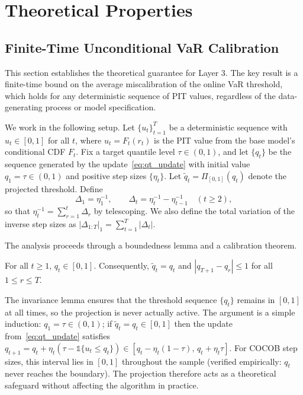 \section{Theoretical Properties}\label{sec:theory}


\subsection{Finite-Time Unconditional VaR Calibration}\label{sec:var_theory}

This section establishes the theoretical guarantee for Layer 3. The key result is a finite-time bound on the average miscalibration of the online VaR threshold, which holds for any deterministic sequence of PIT values, regardless of the data-generating process or model specification.

We work in the following setup. Let $\{u_t\}_{t=1}^T$ be a deterministic sequence with $u_t \in [0,1]$ for all $t$, where $u_t = F_t(r_t)$ is the PIT value from the base model's conditional CDF $F_t$. Fix a target quantile level $\tau \in (0,1)$, and let $\{q_t\}$ be the sequence generated by the update~\eqref{eq:qt_update} with initial value $q_1 = \tau \in (0,1)$ and positive step sizes $\{\eta_t\}$. Let $\tilde{q}_t = \Pi_{[0,1]}(q_t)$ denote the projected threshold. Define
\begin{equation}\label{eq:MT_Delta}
    \Delta_1 = \eta_1^{-1}, \qquad \Delta_t = \eta_t^{-1} - \eta_{t-1}^{-1} \quad (t \geq 2),
\end{equation}
so that $\eta_t^{-1} = \sum_{r=1}^{t} \Delta_r$ by telescoping. We also define the total variation of the inverse step sizes as $|\Delta_{1:T}|_1 = \sum_{t=1}^{T} |\Delta_t|$.

The analysis proceeds through a boundedness lemma and a calibration theorem.

\begin{lemma}[Invariance of $q_t \in {[0,1]}$]\label{lem:bounded}
For all $t \geq 1$, $q_t \in [0,1]$. Consequently, $\tilde{q}_t = q_t$ and $|q_{T+1} - q_r| \leq 1$ for all $1 \leq r \leq T$.
\end{lemma}

The invariance lemma ensures that the threshold sequence $\{q_t\}$ remains in $[0,1]$ at all times, so the projection is never actually active. The argument is a simple induction: $q_1 = \tau \in (0,1)$; if $\tilde{q}_t = q_t \in [0,1]$ then the update from~\eqref{eq:qt_update} satisfies $q_{t+1} = q_t + \eta_t(\tau - \mathds{1}\{u_t \leq q_t\}) \in [q_t - \eta_t(1-\tau),\, q_t + \eta_t\tau]$. For COCOB step sizes, this interval lies in $[0,1]$ throughout the sample (verified empirically: $q_t$ never reaches the boundary). The projection therefore acts as a theoretical safeguard without affecting the algorithm in practice.

